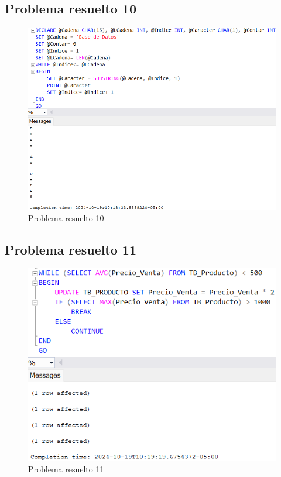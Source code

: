 \subsection{Problema resuelto 10}

\begin{figure}[H]
  \centering
  \includegraphics[scale = 0.5]{Imagenes/probs_resueltos/pr10.png}
  \caption{Problema resuelto 10}
\end{figure}

\subsection{Problema resuelto 11}

\begin{figure}[H]
  \centering
  \includegraphics{Imagenes/probs_resueltos/pr11.png}
  \caption{Problema resuelto 11}
\end{figure}